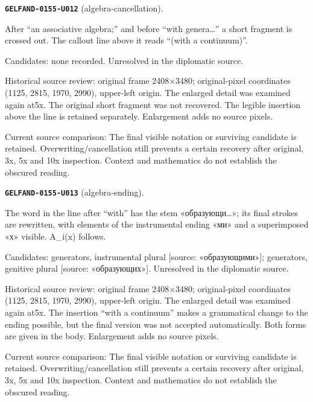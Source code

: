 \medskip
\par\noindent\leavevmode{}\label{GELFAND-0155-U012}\label{GELFAND-P001429:algebra-cancellation}\textbf{\texttt{GELFAND-0155-U012}} (algebra-cancellation).\nopagebreak[4]\par
After “an associative algebra;” and before “with genera…” a short fragment is crossed out. The callout line above it reads “(with a continuum)”.\par
Candidates: none recorded. Unresolved in the diplomatic source.\par
Historical source review: original frame 2408×3480; original-pixel coordinates (1125, 2815, 1970, 2990), upper-left origin. The enlarged detail was examined again at5x. The original short fragment was not recovered. The legible insertion above the line is retained separately. Enlargement adds no source pixels.\par
Current source comparison: The final visible notation or surviving candidate is retained. Overwriting/cancellation still prevents a certain recovery after original, 3x, 5x and 10x inspection. Context and mathematics do not establish the obscured reading.\par
\medskip
\par\noindent\leavevmode{}\label{GELFAND-0155-U013}\label{GELFAND-P001429:algebra-ending}\textbf{\texttt{GELFAND-0155-U013}} (algebra-ending).\nopagebreak[4]\par
The word in the line after “with” has the stem «образующи…»; its final strokes are rewritten, with elements of the instrumental ending «ми» and a superimposed «х» visible. A\_i(x) follows.\par
Candidates: generators, instrumental plural [source: «образующими»]; generators, genitive plural [source: «образующих»]. Unresolved in the diplomatic source.\par
Historical source review: original frame 2408×3480; original-pixel coordinates (1125, 2815, 1970, 2990), upper-left origin. The enlarged detail was examined again at5x. The insertion “with a continuum” makes a grammatical change to the ending possible, but the final version was not accepted automatically. Both forms are given in the body. Enlargement adds no source pixels.\par
Current source comparison: The final visible notation or surviving candidate is retained. Overwriting/cancellation still prevents a certain recovery after original, 3x, 5x and 10x inspection. Context and mathematics do not establish the obscured reading.\par
\medskip
